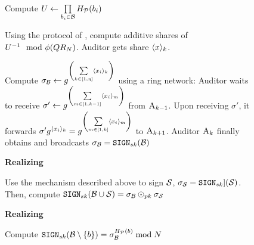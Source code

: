 \begin{figure}[h]
{\begin{minipage}[t]{\textwidth}
\enumListStart
\item Compute $\accSet \assign \prod\limits_{\genericBlocklistElmt[\setIdx] \in \blocklist} \primeRO(\genericBlocklistElmt[\setIdx])$ 
\enumListStart
\item Using the protocol of \citet[Fig 3]{catalano2000computing}, compute additive shares of $\accSet^{-1} \mod \orderFn(\qrGroup)$. Auditor \auditor[\auditorIdx] gets share $\langle \genericSetElmt\rangle_{\auditorIdx}$.
\item Compute $\genericSig[\blocklist] \assign \qrGen^{\left(\sum\limits_{\auditorIdx \in [1, \numAuditors]} \langle \genericSetElmt[\setIdx] \rangle_{\auditorIdx}\right)}$ using a ring network: Auditor \auditor[\auditorIdx] waits to receive $\sigma' \assign \qrGen^{\left(\sum\limits_{m \in [1, \auditorIdx - 1]} \langle \genericSetElmt[\setIdx] \rangle_{m}\right)}$ from $\auditor[\auditorIdx - 1]$. Upon receiving $\sigma'$, it forwards $\sigma' \qrGen^{\langle \genericSetElmt[\setIdx] \rangle_{\auditorIdx}} =  \qrGen^{\left(\sum\limits_{m \in [1, \auditorIdx ]} \langle \genericSetElmt[\setIdx] \rangle_{m}\right)}$ to $\auditor[\auditorIdx + 1]$. Auditor $\auditor[\auditorIdx]$ finally obtains and broadcasts $\genericSig[\blocklist] = \sign[\auditorPrivKeyOurScheme](\blocklist)$


\enumListEnd
\enumListEnd

\smallskip\noindent\textbf{Realizing \distAdd}

\noindent Use the mechanism described above to sign $\genericSetVar$, $\genericSig[\genericSetVar] = \sign[\auditorPrivKeyOurScheme]](\genericSetVar)$.  Then, compute $\sign[\auditorPrivKeyOurScheme](\blocklist \cup \genericSetVar) = \genericSig[\blocklist] \sigHomomorphism[\pubKey] \genericSig[\genericSetVar]$ 

\smallskip\noindent\textbf{Realizing \distDel}

\noindent Compute $\sign[\auditorPrivKeyOurScheme](\blocklist \setminus \{\genericBlocklistElmt \}) = \genericSig[\blocklist]^{\primeRO(\genericBlocklistElmt)} \bmod \rsaMod$ 


\end{minipage}}
\end{figure}
